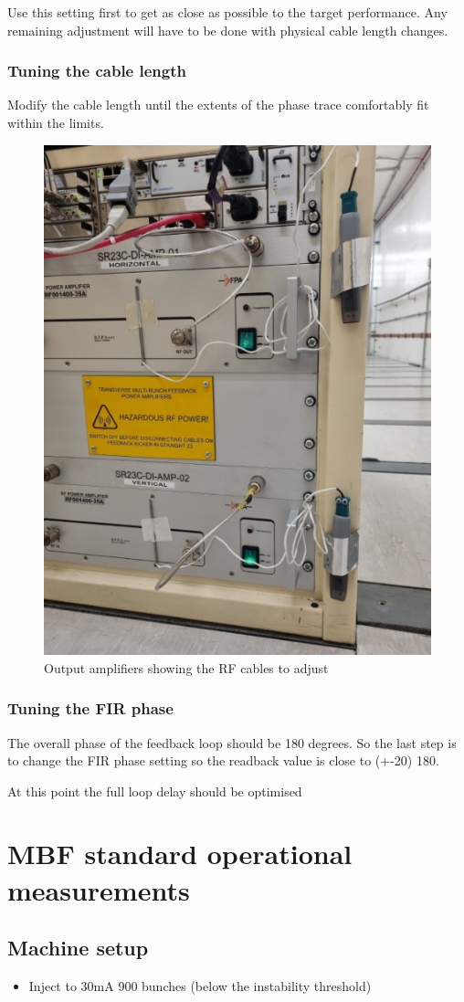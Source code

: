 \documentclass{report}
\begin{document}
Use this setting first to get as close as possible to the target performance. Any remaining adjustment will have to be done with physical cable length changes. 
\clearpage
\subsubsection{Tuning the cable length} 
Modify the cable length until the extents of the phase trace comfortably fit within the limits.  
\begin{figure}[ht]
    \centering
    \includegraphics[width=0.6\linewidth]{amp_front.png}
    \caption{Output amplifiers showing the RF cables to adjust}
    \label{fig:output_amplifiers}
\end{figure}

\subsubsection{Tuning the FIR phase}
The overall phase of the feedback loop should be 180 degrees. So the last step is to change the FIR phase setting so the readback value is close to (+-20) 180.

At this point the full loop delay should be optimised
\clearpage

\section{MBF standard operational measurements}
\subsection{Machine setup} 
\begin{itemize}
    \item {Inject to 30mA 900 bunches (below the instability threshold)}
\end{itemize}
\end{document}
